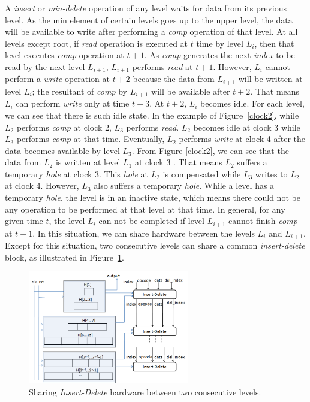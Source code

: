 \documentclass[10pt, conference, compsocconf]{IEEEtran}
\begin{document}
A {\it insert} or {\it min-delete} operation of any level waits for data from its previous level.
As the min element of certain levels goes up to the upper level, the data will be available to write after performing a {\it comp} operation of that level.
At all levels except root, if {\it read} operation is executed at $t$ time by level $L_i$, then that level executes {\it comp} operation at $t+1$.
As {\it comp} generates the next {\it index} to be read by the next level $L_{i+1}$, $L_{i+1}$ performs {\it read} at $t+1$.
However, $L_i$ cannot perform a {\it write} operation at $t+2$ because the data from $L_{i+1}$ will be written at level $L_i$; the resultant of {\it comp} by $L_{i+1}$ will be available after $t+2$.
That means $L_i$ can perform {\it write} only at time $t+3$.
At $t+2$, $L_i$ becomes idle.
For each level, we can see that there is such idle state.
In the example of Figure~\ref{clock2}, while $L_2$ performs {\it comp} at clock 2, $L_3$ performs {\it read}.
$L_2$ becomes idle at clock 3 while $L_3$ performs {\it comp} at that time.
Eventually, $L_2$ performs {\it write} at clock 4 after the data becomes available by level $L_3$.
From Figure \ref{clock2}, we can see that the data from $L_2$ is written at level $L_1$ at clock 3 .
That means $L_2$ suffers a temporary {\it hole} at clock 3.
This {\it hole} at $L_2$ is compensated while $L_3$ writes to $L_2$ at clock 4.
However, $L_3$ also suffers a temporary {\it hole}.
While a level has a temporary {\it hole}, the level is in an inactive state, which means there could not be any operation to be performed at that level at that time.
In general, for any given time $t$, the level $L_i$ can not be completed if level $L_{i+1}$ cannot finish {\it comp} at $t+1$.
In this situation, we can share hardware between the levels $L_i$ and $L_{i+1}$.
Except for this situation, two consecutive levels can share a common {\it insert-delete} block, as illustrated in Figure~\ref{d3}.

\begin{figure}[!ht]
  \centering
  \includegraphics[width=7cm]{Figures/d3.png}
      \caption{Sharing {\it Insert-Delete} hardware between two consecutive levels.}
    \label{d3}
\end{figure}
\end{document}
